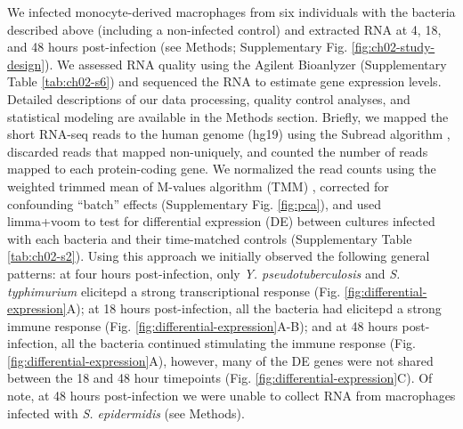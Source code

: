 We infected monocyte-derived macrophages from six individuals with the
bacteria described above (including a non-infected control) and
extracted RNA at 4, 18, and 48 hours post-infection (see Methods;
Supplementary Fig. \ref{fig:ch02-study-design}). We assessed RNA
quality using the Agilent Bioanlyzer (Supplementary Table
\ref{tab:ch02-s6}) and sequenced the RNA to estimate gene expression
levels. Detailed descriptions of our data processing, quality control
analyses, and statistical modeling are available in the Methods
section. Briefly, we mapped the short RNA-seq reads to the human
genome (hg19) using the Subread algorithm \citep{Liao2013}, discarded
reads that mapped non-uniquely, and counted the number of reads mapped
to each protein-coding gene. We normalized the read counts using the
weighted trimmed mean of M-values algorithm (TMM)
\citep{Robinson2010}, corrected for confounding ``batch'' effects
(Supplementary Fig. \ref{fig:pca}), and used limma+voom
\citep{Smyth2004, Smyth2005, Law2014} to test for differential
expression (DE) between cultures infected with each bacteria and their
time-matched controls (Supplementary Table \ref{tab:ch02-s2}). Using
this approach we initially observed the following general patterns: at
four hours post-infection, only \emph{Y. pseudotuberculosis} and
\emph{S. typhimurium} elicitepd a strong transcriptional response
(Fig.  \ref{fig:differential-expression}A); at 18 hours
post-infection, all the bacteria had elicitepd a strong immune
response (Fig. \ref{fig:differential-expression}A-B); and at 48 hours
post-infection, all the bacteria continued stimulating the immune
response (Fig. \ref{fig:differential-expression}A), however, many of
the DE genes were not shared between the 18 and 48 hour timepoints
(Fig. \ref{fig:differential-expression}C). Of note, at 48 hours
post-infection we were unable to collect RNA from macrophages infected
with \emph{S.  epidermidis} (see Methods).

